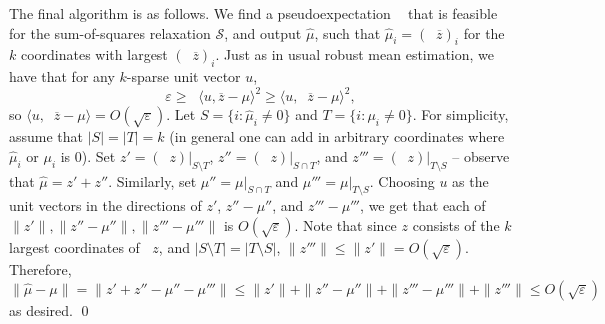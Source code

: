 \documentclass[11pt]{article}
\theoremstyle{definition}
\renewcommand{\epsilon}{\varepsilon}
\DeclareMathOperator{\pE}{\widetilde{\mathbb{E}}} %
\begin{document}
\begin{enumerate}[label=(\alph*)]
  The final algorithm is as follows. We find a pseudoexpectation $\pE$ that is feasible for the sum-of-squares relaxation $\mathcal{S}$, and output $\hat{\mu}$, such that $\hat{\mu}_i = (\pE \overline{z})_i$ for the $k$ coordinates with largest $(\pE \overline{z})_i$.
  Just as in usual robust mean estimation, we have that for any $k$-sparse unit vector $u$,
  \[ \epsilon \ge \pE \langle u,\overline{z}-\mu\rangle^2 \ge \langle u, \pE \overline{z}-\mu\rangle^2, \]
  so $\langle u, \pE \overline{z} - \mu\rangle = O(\sqrt{\epsilon})$.
  Let $S = \{i : \hat{\mu}_i \ne 0\}$ and $T = \{i : \mu_i \ne 0\}$. For simplicity, assume that $|S|=|T|=k$ (in general one can add in arbitrary coordinates where $\hat{\mu}_i$ or $\mu_i$ is $0$). Set $z' = (\pE z)|_{S \setminus T}$, $z'' = (\pE z)|_{S \cap T}$, and $z''' = (\pE z)|_{T \setminus S}$ -- observe that $\hat{\mu} = z' + z''$. Similarly, set $\mu'' = \mu|_{S \cap T}$ and $\mu''' = \mu|_{T \setminus S}$. Choosing $u$ as the unit vectors in the directions of $z'$, $z''-\mu''$, and $z'''-\mu'''$, we get that each of $\|z'\|,\|z''-\mu''\|,\|z'''-\mu'''\|$ is $O(\sqrt{\epsilon})$. Note that since $z$ consists of the $k$ largest coordinates of $\pE z$, and $|S \setminus T| = |T \setminus S|$, $\|z'''\| \le \|z'\| = O(\sqrt{\epsilon})$. Therefore,
  \[ \|\hat{\mu} - \mu\| = \|z' + z'' - \mu'' - \mu'''\| \le \|z'\| + \|z'' - \mu''\| + \|z''' - \mu'''\| + \|z'''\| \le O(\sqrt{\epsilon}) \]
  as desired. \qed
\end{enumerate}

\clearpage
\end{document}
